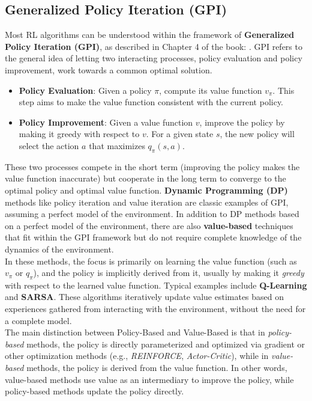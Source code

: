 \subsection{Generalized Policy Iteration (GPI)}
Most RL algorithms can be understood within the framework of \textbf{Generalized Policy Iteration (GPI)}, as described in Chapter 4 of the book: \cite{Sutton2018}. GPI refers to the general idea of letting two interacting processes, policy evaluation and policy improvement, work towards a common optimal solution.

\begin{itemize}
    \item \textbf{Policy Evaluation}: Given a policy $\pi$, compute its value function $v_\pi$. This step aims to make the value function consistent with the current policy.
    \item \textbf{Policy Improvement}: Given a value function $v$, improve the policy by making it greedy with respect to $v$. For a given state $s$, the new policy will select the action $a$ that maximizes $q_\pi(s, a)$.
\end{itemize}
\noindent
These two processes compete in the short term (improving the policy makes the value function inaccurate) but cooperate in the long term to converge to the optimal policy and optimal value function. \textbf{Dynamic Programming (DP)} methods like policy iteration and value iteration are classic examples of GPI, assuming a perfect model of the environment.
\noindent
In addition to DP methods based on a perfect model of the environment, there are also \textbf{value-based} techniques that fit within the GPI framework but do not require complete knowledge of the dynamics of the environment.
\\
\noindent
In these methods, the focus is primarily on learning the value function (such as $v_\pi$ or $q_\pi$), and the policy is implicitly derived from it, usually by making it \textit{greedy} with respect to the learned value function. Typical examples include \textbf{Q-Learning} and \textbf{SARSA}. These algorithms iteratively update value estimates based on experiences gathered from interacting with the environment, without the need for a complete model.
\\
\noindent
The main distinction between Policy-Based and Value-Based is that in \textit{policy-based} methods, the policy is directly parameterized and optimized via gradient or other optimization methods (e.g., \textit{REINFORCE}, \textit{Actor-Critic}), while in \textit{value-based} methods, the policy is derived from the value function. In other words, value-based methods use value as an intermediary to improve the policy, while policy-based methods update the policy directly.



